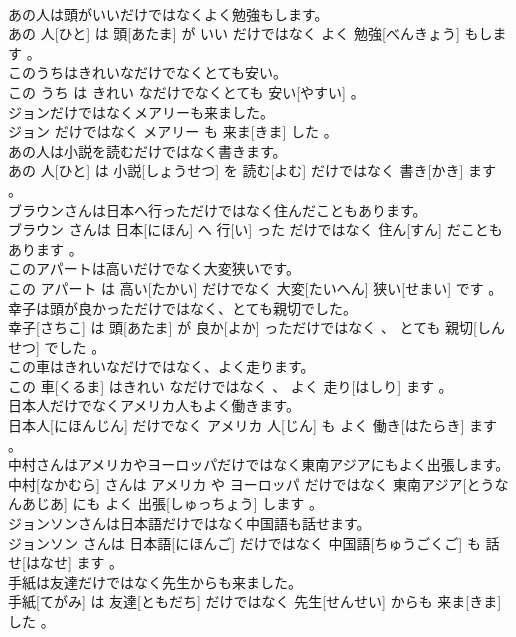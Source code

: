 \documentclass[8pt]{extreport}
\begin{document}
\begin{CJK}{UTF8}{min}
\\	あの人は頭がいいだけではなくよく勉強もします。	
\\	あの 人[ひと] は 頭[あたま] が いい だけではなく よく 勉強[べんきょう] もします 。
\\	このうちはきれいなだけでなくとても安い。	
\\	この うち は きれい なだけでなくとても 安い[やすい] 。
\\	ジョンだけではなくメアリーも来ました。	
\\	ジョン だけではなく メアリー も 来ま[きま] した 。
\\	あの人は小説を読むだけではなく書きます。	
\\	あの 人[ひと] は 小説[しょうせつ] を 読む[よむ] だけではなく 書き[かき] ます 。
\\	ブラウンさんは日本へ行っただけではなく住んだこともあります。	
\\	ブラウン さんは 日本[にほん] へ 行[い] った だけではなく 住ん[すん] だこともあります 。
\\	このアパートは高いだけでなく大変狭いです。	
\\	この アパート は 高い[たかい] だけでなく 大変[たいへん] 狭い[せまい] です 。
\\	幸子は頭が良かっただけではなく、とても親切でした。	
\\	幸子[さちこ] は 頭[あたま] が 良か[よか] っただけではなく 、 とても 親切[しんせつ] でした 。
\\	この車はきれいなだけではなく、よく走ります。	
\\	この 車[くるま] はきれい なだけではなく 、 よく 走り[はしり] ます 。
\\	日本人だけでなくアメリカ人もよく働きます。	
\\	日本人[にほんじん] だけでなく アメリカ 人[じん] も よく 働き[はたらき] ます 。
\\	中村さんはアメリカやヨーロッパだけではなく東南アジアにもよく出張します。	
\\	中村[なかむら] さんは アメリカ や ヨーロッパ だけではなく 東南アジア[とうなんあじあ] にも よく 出張[しゅっちょう] します 。
\\	ジョンソンさんは日本語だけではなく中国語も話せます。	
\\	ジョンソン さんは 日本語[にほんご] だけではなく 中国語[ちゅうごくご] も 話せ[はなせ] ます 。
\\	手紙は友達だけではなく先生からも来ました。	
\\	手紙[てがみ] は 友達[ともだち] だけではなく 先生[せんせい] からも 来ま[きま] した 。

\end{CJK}
\end{document}
